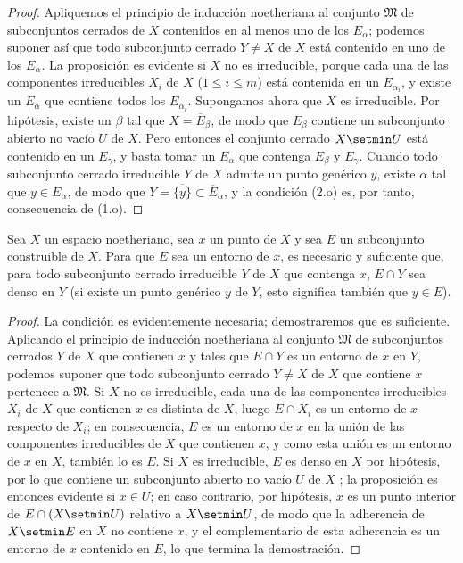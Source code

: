 \documentclass[oneside]{amsart}
\renewcommand{\leq}{\leqslant}
\newcommand{\oldpage}[2][]{{\marginnote{\normalfont\textbf{#1}~|~#2}}\ignorespaces}
\let\EGAOriginalLabel\label
\renewcommand{\label}[1]{\phantomsection\EGAOriginalLabel{#1}}
\begin{document}
\begin{proof}
Apliquemos el principio de inducción noetheriana  al conjunto $\mathfrak{M}$ de subconjuntos cerrados de $X$ contenidos en al menos uno de los $E_\alpha$; podemos suponer así que todo subconjunto cerrado $Y\neq X$ de $X$ está contenido en uno de los $E_\alpha$.
La proposición es evidente si $X$ no es irreducible, porque cada una de las componentes irreducibles $X_i$ de $X$ ($1\leq i\leq m$) está contenida en un $E_{\alpha_i}$, y existe un $E_\alpha$ que contiene todos los $E_{\alpha_i}$.
Supongamos ahora que $X$ es irreducible.
Por hipótesis, existe un $\beta$ tal que $X=\overline{E}_\beta$, de modo que  $E_\beta$ contiene un subconjunto abierto no vacío $U$ de $X$.
Pero entonces el conjunto cerrado $X\setmin U$ está contenido en un $E_\gamma$, y basta tomar un $E_\alpha$ que contenga $E_\beta$ y $E_\gamma$.
Cuando todo subconjunto cerrado irreducible $Y$ de $X$
\oldpage[0\textsubscript{III}]{16}
admite un punto genérico $y$, existe $\alpha$ tal que $y\in E_\alpha$, de modo que $Y=\overline{\{y\}}\subset\overline{E}_\alpha$, y la condición (2.o) es, por tanto, consecuencia de (1.o).
\end{proof}

\begin{proposition}[9.2.5]
\label{0.9.2.5}
Sea $X$ un espacio noetheriano, sea $x$ un punto de $X$ y sea $E$ un subconjunto construible de $X$.
Para que $E$ sea un entorno de $x$, es necesario y suficiente que, para todo subconjunto cerrado irreducible $Y$ de $X$ que contenga $x$, $E\cap Y$ sea denso en $Y$ (si existe un punto genérico $y$ de $Y$, esto significa también  que $y\in E$).
\end{proposition}

\begin{proof}
La condición es evidentemente necesaria; demostraremos que es suficiente.
Aplicando el principio de inducción noetheriana al conjunto $\mathfrak{M}$ de subconjuntos cerrados $Y$ de $X$ que contienen $x$ y tales que $E\cap Y$ es un entorno de $x$ en $Y$, podemos suponer que todo subconjunto cerrado $Y\neq X$ de $X$ que contiene $x$ pertenece a $\mathfrak{M}$.
Si $X$ no es irreducible, cada una de las componentes irreducibles $X_i$ de $X$ que contienen $x$ es distinta de $X$, luego $E\cap X_i$ es un entorno de $x$ respecto de $X_i$; en consecuencia, $E$ es un entorno de $x$ en la unión de las componentes irreducibles de $X$ que contienen $x$, y como esta unión es un entorno de $x$ en $X$, también lo es $E$.
Si $X$ es irreducible, $E$ es denso en $X$ por hipótesis, por lo que contiene un subconjunto abierto no vacío $U$ de $X$ ; la proposición es entonces evidente si $x\in U$; en caso contrario, por hipótesis, $x$ es un punto interior de $E\cap(X\setmin U)$ relativo a $X\setmin U$, de modo que la adherencia de $X\setmin E$ en $X$ no contiene $x$, y el complementario de esta adherencia es un entorno de $x$ contenido en $E$, lo que termina la demostración.
\end{proof}
\end{document}
